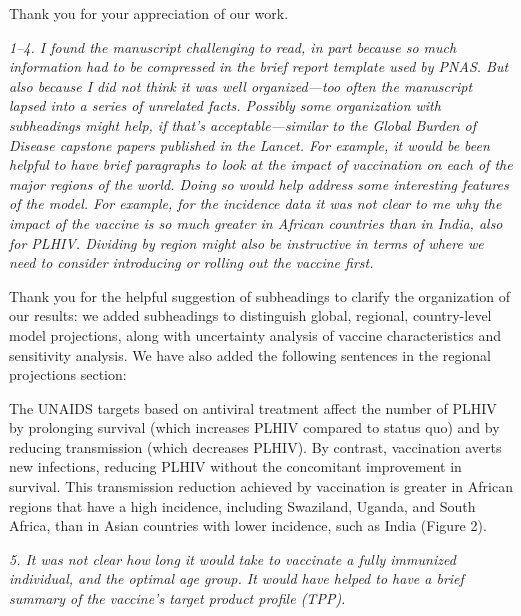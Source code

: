 \documentclass[12pt]{jpmletter}
\newenvironment{original}{\it}{}
\begin{document}
\begin{letter}{}
    Thank you for your appreciation of our work.

    \begin{original}
      1–4. I found the manuscript challenging to read, in part
      because so much information had to be compressed in the brief
      report template used by PNAS. But also because I did not think
      it was well organized—too often the manuscript lapsed into a
      series of unrelated facts. Possibly some organization with
      subheadings might help, if that's acceptable—similar to the
      Global Burden of Disease capstone papers published in the
      Lancet. For example, it would be been helpful to have brief
      paragraphs to look at the impact of vaccination on each of the
      major regions of the world. Doing so would help address some
      interesting features of the model. For example, for the
      incidence data it was not clear to me why the impact of the
      vaccine is so much greater in African countries than in India,
      also for PLHIV. Dividing by region might also be instructive in
      terms of where we need to consider introducing or rolling out
      the vaccine first.
    \end{original}

    Thank you for the helpful suggestion of subheadings to clarify the
    organization of our results: we added subheadings to distinguish
    global, regional, country-level model projections, along with
    uncertainty analysis of vaccine characteristics and sensitivity
    analysis.  We have also added the following sentences in the
    regional projections section:
    \begin{quoting}
      The UNAIDS targets based on antiviral treatment affect the
      number of PLHIV by prolonging survival (which increases PLHIV
      compared to status quo) and by reducing transmission (which
      decreases PLHIV). By contrast, vaccination averts new
      infections, reducing PLHIV without the concomitant improvement
      in survival.  This transmission reduction achieved by
      vaccination is greater in African regions that have a high
      incidence, including Swaziland, Uganda, and South Africa, than
      in Asian countries with lower incidence, such as India (Figure
      2).
    \end{quoting}

    \begin{original}
      5. It was not clear how long it would take to vaccinate
      a fully immunized individual, and the optimal age group. It
      would have helped to have a brief summary of the vaccine's
      target product profile (TPP).
    \end{original}


\end{letter}
\end{document}
